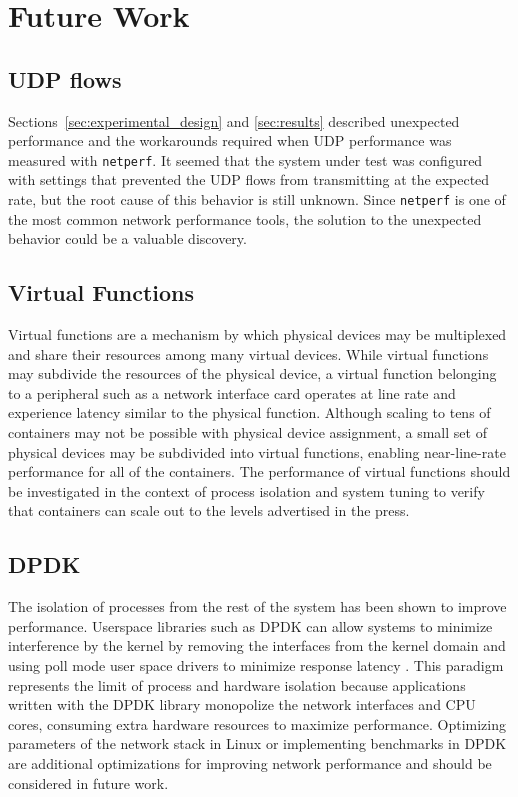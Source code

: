 \section{Future Work}
\label{sec:futurework}

\subsection{UDP flows} %
\label{sec:futureudpflows}
Sections~\ref{sec:experimental_design} and \ref{sec:results} described unexpected performance and the workarounds required when UDP performance was measured with \texttt{netperf}. 
It seemed that the system under test was configured with settings that prevented the UDP flows from transmitting at the expected rate, but the root cause of this behavior is still unknown.  
Since \texttt{netperf} is one of the most common network performance tools, the solution to the unexpected behavior could be a valuable discovery.

\subsection{Virtual Functions} %
\label{sec:futurevirtualfunctions}
Virtual functions are a mechanism by which physical devices may be multiplexed and share their resources among many virtual devices.  
While virtual functions may subdivide the resources of the physical device, a virtual function belonging to a peripheral such as a network interface card operates at line rate and experience latency similar to the physical function.  
Although scaling to tens of containers may not be possible with physical device assignment, a small set of physical devices may be subdivided into virtual functions, enabling near-line-rate performance for all of the containers.  
The performance of virtual functions should be investigated in the context of process isolation and system tuning to verify that containers can scale out to the levels advertised in the press.  

\subsection{DPDK} %
\label{sec:futuredpdk}
The isolation of processes from the rest of the system has been shown to improve performance.
Userspace libraries such as DPDK can allow systems to minimize interference by the kernel by removing the interfaces from the kernel domain and using poll mode user space drivers to minimize response latency \autocite{_dpdk_1}.  
This paradigm represents the limit of process and hardware isolation because applications written with the DPDK library monopolize the network interfaces and CPU cores, consuming extra hardware resources to maximize performance.
Optimizing parameters of the network stack in Linux or implementing benchmarks in DPDK are additional optimizations for improving network performance and should be considered in future work.

